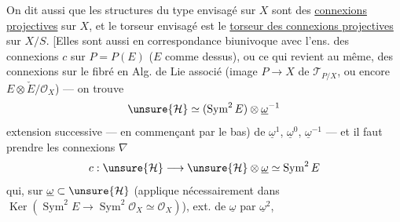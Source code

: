On dit aussi que les structures du type envisagé sur $X$ sont des \uline{connexions projectives} sur $X$, et le torseur envisagé est le \uline{torseur des connexions projectives} sur $X/S$. [Elles sont aussi en correspondance biunivoque avec l'ens. des connexions  $c$ sur $P=P(E)$ ($E$ comme dessus), ou ce qui revient au même, des connexions  sur le fibré en Alg. de Lie associé (image  $P\longrightarrow X$ de $\mathcal T_{P/X}$, ou encore $E\otimes\check E/\mathcal O_X$) --- on trouve
\[\unsure{\mathcal H}\simeq(\operatorname{Sym}^2E)\otimes\underline\omega^{-1}\]
extension successive --- en commençant par le bas) de $\underline\omega^1$, $\underline\omega^0$, $\underline\omega^{-1}$ --- et il faut prendre les connexions $\nabla$
\[
c:\unsure{\mathcal H}\longrightarrow\unsure{\mathcal H}\otimes\underline\omega\simeq\operatorname{Sym}^2E
\]
qui, sur $\underline\omega\subset\unsure{\mathcal H}$ (applique nécessairement dans $\operatorname{Ker}(\operatorname{Sym}^2E\longrightarrow\operatorname{Sym}^2\mathcal O_X\simeq\mathcal O_X)$), ext. de $\underline\omega$ par $\underline\omega^2$,
